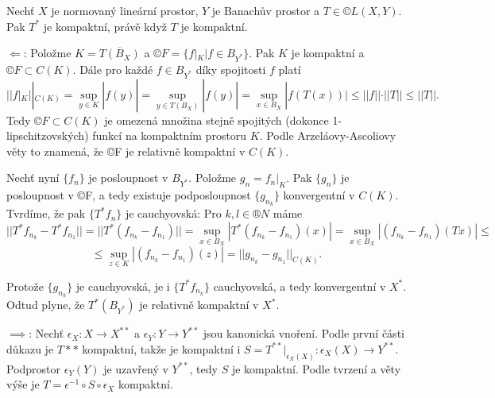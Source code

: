 \documentclass[12pt]{article}					%
\begin{document}

\begin{veta}[J. P. Schauder, 1930]
	Nechť $X$ je normovaný lineární prostor, $Y$ je Banachův prostor a $T \in ©L(X, Y)$. Pak $T^*$ je kompaktní, právě když $T$ je kompaktní.

	\begin{dukazin}[Ze skript]
		$\Leftarrow$: Položme $K = \overline{T(B_X)}$ a $©F = \{f|_K | f \in B_{Y^*}\}$. Pak $K$ je kompaktní a $©F \subset C(K)$. Dále pro každé $f \in B_{Y^*}$ díky spojitosti $f$ platí
		$$ ||f|_K||_{C(K)} = \sup_{y \in K}|f(y)| = \sup_{y \in T(B_X)}|f(y)| = \sup_{x \in B_X}|f(T(x))| ≤ ||f||·||T|| ≤ ||T||. $$
		Tedy $©F \subset C(K)$ je omezená množina stejně spojitých (dokonce 1-lipschitzovských) funkcí na kompaktním prostoru $K$. Podle Arzeláovy-Ascoliovy věty to znamená, že ©F je relativně kompaktní v $C(K)$.

		Nechť nyní $\{f_n\}$ je posloupnost v $B_{Y^*}$. Položme $g_n = f_n|_K$. Pak $\{g_n\}$ je posloupnost v ©F, a tedy existuje podposloupnost $\{g_{n_k}\}$ konvergentní v $C(K)$. Tvrdíme, že pak $\{T^* f_n\}$ je cauchyovská: Pro $k, l \in ®N$ máme
		$$ ||T^* f_{n_k} - T^*f_{n_1}|| = ||T^*(f_{n_k} - f_{n_1})|| = \sup_{x \in B_X} |T^*(f_{n_k} - f_{n_1})(x)| = \sup_{x \in B_X}|(f_{n_k} - f_{n_1})(T x)| ≤ $$
		$$ ≤ \sup_{z \in K}|(f_{n_k} - f_{n_1})(z)| = ||g_{n_k} - g_{n_1}||_{C(K)}. $$

		Protože $\{g_{n_k}\}$ je cauchyovská, je i $\{T^* f_{n_k}\}$ cauchyovská, a tedy konvergentní v $X^*$. Odtud plyne, že $T^*(B_{Y^*})$ je relativně kompaktní v $X^*$.

		$\implies$: Nechť $\epsilon_X: X \rightarrow X^{**}$ a $\epsilon_Y: Y \rightarrow Y^{**}$  jsou kanonická vnoření. Podle první části důkazu je $T**$ kompaktní, takže je kompaktní i $S = T^{**}|_{\epsilon_X(X)}: \epsilon_X(X)\rightarrow Y^{**}$. Podprostor $\epsilon_Y(Y)$ je uzavřený v $Y^{**}$, tedy $S$ je kompaktní. Podle tvrzení a věty výše je $T = \epsilon^{-1} \circ S \circ \epsilon_X$ kompaktní.
	\end{dukazin}
\end{veta}
\end{document}
